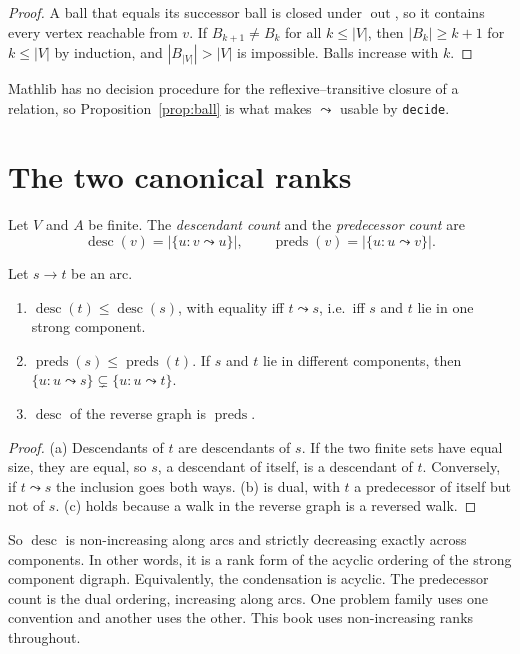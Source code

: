 \begin{proof}
A ball that equals its successor ball is closed under \(\operatorname{out}\), so it contains
every vertex reachable from \(v\). If \(B_{k+1}\neq B_k\) for all \(k\le|V|\), then
\(|B_k|\ge k+1\) for \(k\le|V|\) by induction, and \(|B_{|V|}|>|V|\) is impossible. Balls
increase with \(k\).
\end{proof}

Mathlib has no decision procedure for the reflexive--transitive closure of a relation, so
Proposition~\ref{prop:ball} is what makes \(\leadsto\) usable by \texttt{decide}.

\section{The two canonical ranks}

Let \(V\) and \(A\) be finite. The \emph{descendant count} and the \emph{predecessor count} are
\[
  \operatorname{desc}(v)=|\{u : v\leadsto u\}|,\qquad
  \operatorname{preds}(v)=|\{u : u\leadsto v\}| .
\]

\begin{proposition}\label{prop:desc}
Let \(s\to t\) be an arc.
\begin{enumerate}[label=(\alph*)]
\item \(\operatorname{desc}(t)\le\operatorname{desc}(s)\), with equality iff \(t\leadsto s\),
  i.e.\ iff \(s\) and \(t\) lie in one strong component.
\item \(\operatorname{preds}(s)\le\operatorname{preds}(t)\). If \(s\) and \(t\) lie in different
  components, then \(\{u: u\leadsto s\}\subsetneq\{u:u\leadsto t\}\).
\item \(\operatorname{desc}\) of the reverse graph is \(\operatorname{preds}\).
\end{enumerate}
\end{proposition}

\begin{proof}
(a) Descendants of \(t\) are descendants of \(s\). If the two finite sets have equal size, they
are equal, so \(s\), a descendant of itself, is a descendant of \(t\). Conversely, if
\(t\leadsto s\) the inclusion goes both ways. (b) is dual, with \(t\) a predecessor of itself
but not of \(s\). (c) holds because a walk in the reverse graph is a reversed walk.
\end{proof}

So \(\operatorname{desc}\) is non-increasing along arcs and strictly decreasing exactly across
components. In other words, it is a rank form of the acyclic ordering of the strong component
digraph. Equivalently, the condensation is acyclic. The predecessor count is the dual ordering,
increasing along arcs. One problem family uses one convention and another uses the other. This
book uses non-increasing ranks throughout.

